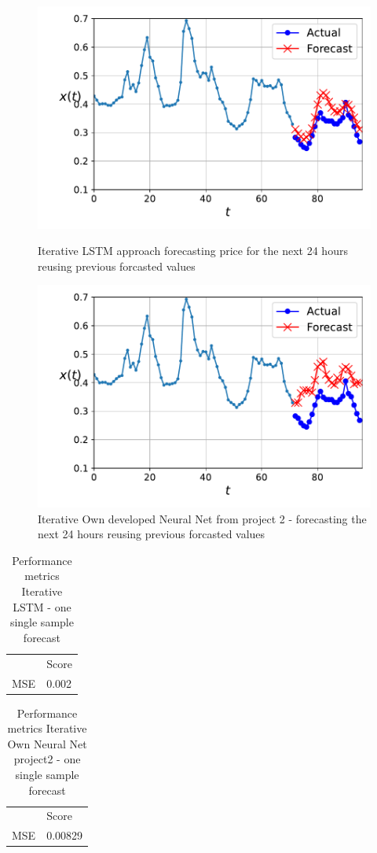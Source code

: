 \documentclass
[twocolumn,
secnumarabic,
nobibnotes,
aps,
prl,
reprint,
groupedaddress,
amsmath,
amssymb,
]{revtex4-2}
\begin{document}
\begin{figure}
  \includegraphics[width=\columnwidth]{figures/iterative_LSTM.pdf}
  \caption{\label{fig:iterative_LSTM}Iterative LSTM approach forecasting price for the next 24 hours reusing previous forcasted values}
  \includegraphics[width=\columnwidth]{figures/iterative_OWN_NN.pdf}
  \caption{\label{fig:iterative_NN}Iterative Own developed Neural Net from project 2 - forecasting the next 24 hours reusing previous forcasted values}
\end{figure}

\begin{table}[]
  \caption{\label{tab:iterativ_LSTM} Performance metrics Iterative LSTM - one single sample forecast}
  \begin{tabular}{l|l|}
       & Score   \\
  MSE  & 0.002 
  \end{tabular}
\end{table}
\begin{table}[]
  \caption{\label{tab:iterativ_own_NN} Performance metrics Iterative Own Neural Net project2 - one single sample forecast}
  \begin{tabular}{l|l|}
       & Score   \\
  MSE  & 0.00829 
  \end{tabular}
\end{table}
\end{document}

